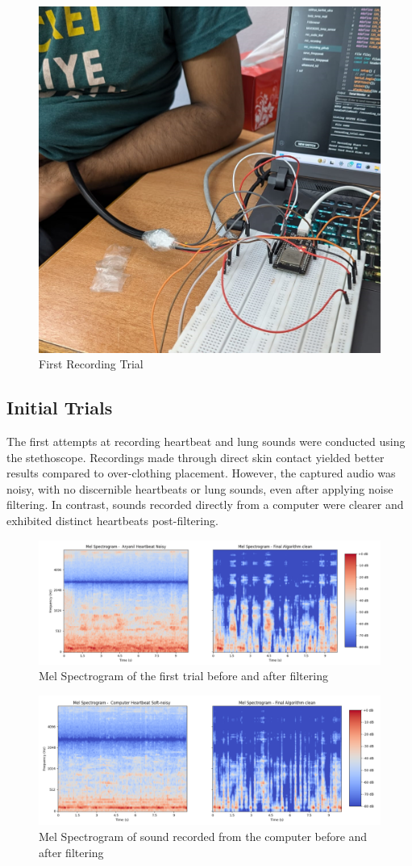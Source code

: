 \documentclass[conference]{IEEEtran}
\begin{document}
\begin{figure}[h]
    \centering
    \includegraphics[width=0.5\linewidth]{Images/first_trial.png}
    \caption{First Recording Trial}
    \label{fig:enter-label}
\end{figure}

\subsection{Initial Trials}
The first attempts at recording heartbeat and lung sounds were conducted using the stethoscope. Recordings made through direct skin contact yielded better results compared to over-clothing placement. However, the captured audio was noisy, with no discernible heartbeats or lung sounds, even after applying noise filtering. In contrast, sounds recorded directly from a computer were clearer and exhibited distinct heartbeats post-filtering.

\begin{figure}[h]
    \centering
    \includegraphics[width=1\linewidth]{Images/trial_spectrogram.png}
    \caption{Mel Spectrogram of the first trial before and after filtering}
    \label{fig:enter-label}
\end{figure}

\begin{figure}[h]
    \centering
    \includegraphics[width=1\linewidth]{Images/computer_spectrogram.png}
    \caption{Mel Spectrogram of sound recorded from the computer before and after filtering}
    \label{fig:enter-label}
\end{figure}
\end{document}
